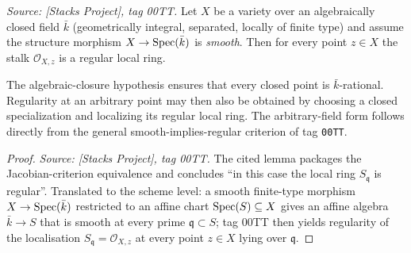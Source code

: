 \begin{lemma}\leanok
  \label{lem:smooth_to_regular_local_ring}
  \textit{Source: [Stacks Project], tag 00TT.}
  Let \(X\) be a variety over an algebraically closed field \(\bar k\) (geometrically
  integral, separated, locally of finite type) and assume the structure morphism
  \(X \to \operatorname{Spec}(\bar k)\) is \emph{smooth}. Then for every point \(z \in X\) the
  stalk \(\mathcal O_{X, z}\) is a regular local ring.

  The algebraic-closure hypothesis ensures that every closed point is
  \(\bar k\)-rational. Regularity at an arbitrary point may then also be obtained by
  choosing a closed specialization and localizing its regular local ring. The
  arbitrary-field form follows directly from the general smooth-implies-regular
  criterion of tag \texttt{00TT}.
\end{lemma}

\begin{proof}
  \textit{Source: [Stacks Project], tag 00TT.} The cited lemma packages the
  Jacobian-criterion equivalence and concludes ``in this case the local ring
  \(S_{\mathfrak q}\) is regular''. Translated to the scheme level: a smooth
  finite-type morphism \(X \to \operatorname{Spec}(\bar k)\) restricted to an affine chart
  \(\operatorname{Spec}(S) \subseteq X\) gives an affine algebra \(\bar k \to S\) that is
  smooth at every prime \(\mathfrak q \subset S\); tag 00TT then yields
  regularity of the localisation \(S_{\mathfrak q} = \mathcal O_{X, z}\) at every
  point \(z \in X\) lying over \(\mathfrak q\).
\end{proof}

